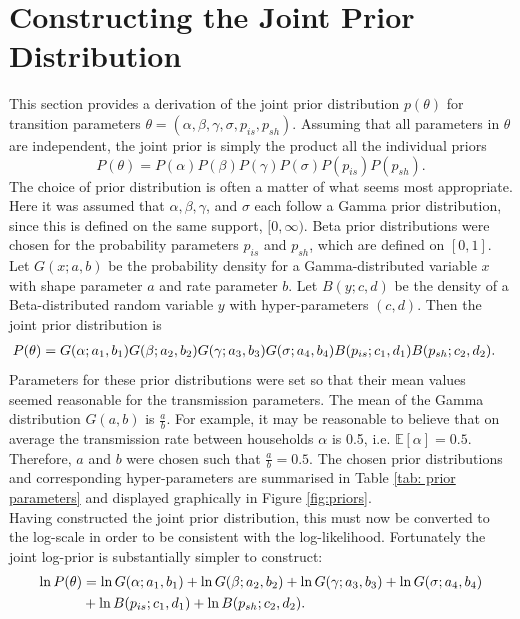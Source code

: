 \section{Constructing the Joint Prior Distribution}
This section provides a derivation of the joint prior distribution $p(\theta)$ for transition parameters $\theta = (\alpha, \beta, \gamma, \sigma, p_{is}, p_{sh})$. Assuming that all parameters in $\theta$ are independent, the joint prior is simply the product all the individual priors
\[ P(\theta) = P(\alpha) P(\beta) P(\gamma) P(\sigma) P(p_{is}) P(p_{sh}) . \]
The choice of prior distribution is often a matter of what seems most appropriate. Here it was assumed that $\alpha, \beta, \gamma$, and $\sigma$ each follow a Gamma prior distribution, since this is defined on the same support, $[0, \infty)$. Beta prior distributions were chosen for the probability parameters $p_{is}$ and $p_{sh}$, which are defined on $[0,1]$. Let $G(x; a,b)$ be the probability density for a Gamma-distributed variable $x$ with shape parameter $a$ and rate parameter $b$. Let $B(y; c,d)$ be the density of a Beta-distributed random variable $y$ with hyper-parameters $(c,d)$.
Then the joint prior distribution is
\begin{align} \notag
P(\theta) &= G(\alpha; a_1,b_1) G(\beta; a_2,b_2) G(\gamma; a_3,b_3) G(\sigma; a_4,b_4) B(p_{is}; c_1,d_1) B(p_{sh}; c_2,d_2).
\end{align}
Parameters for these prior distributions were set so that their mean values seemed reasonable for the transmission parameters. The mean of the Gamma distribution $G(a,b)$ is $\frac{a}{b}$. For example, it may be reasonable to believe that on average the transmission rate between households $\alpha$ is 0.5, i.e. $\mathbb{E}[\alpha] = 0.5$. Therefore, $a$ and $b$ were chosen such that $\frac{a}{b} = 0.5$.
The chosen prior distributions and corresponding hyper-parameters are summarised in Table \ref{tab: prior parameters} and displayed graphically in Figure \ref{fig:priors}.\\
Having constructed the joint prior distribution, this must now be converted to the log-scale in order to be consistent with the log-likelihood. Fortunately the joint log-prior is substantially simpler to construct:
\begin{align} \notag
\ln P(\theta) &= \ln G(\alpha; a_1,b_1) + \ln G(\beta; a_2,b_2) + \ln G(\gamma; a_3,b_3) + \ln G(\sigma; a_4,b_4) \\ \notag
&+ \ln B(p_{is}; c_1,d_1) + \ln B(p_{sh}; c_2,d_2).
\end{align}

